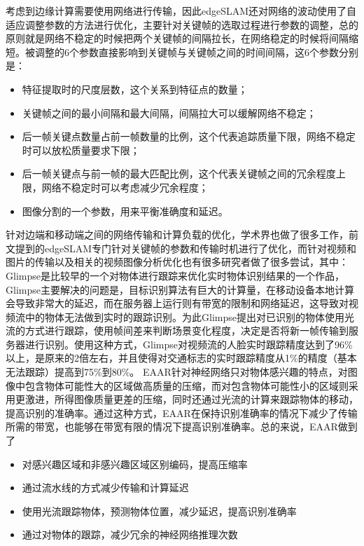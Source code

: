 考虑到边缘计算需要使用网络进行传输，因此edgeSLAM还对网络的波动使用了自适应调整参数的方法进行优化，主要针对关键帧的选取过程进行参数的调整，总的原则就是网络不稳定的时候把两个关键帧的间隔拉长，在网络稳定的时候将间隔缩短。被调整的6个参数直接影响到关键帧与关键帧之间的时间间隔，这6个参数分别是：
\begin{itemize}
  \item 特征提取时的尺度层数，这个关系到特征点的数量；
  \item 关键帧之间的最小间隔和最大间隔，间隔拉大可以缓解网络不稳定；
  \item 后一帧关键点数量占前一帧数量的比例，这个代表追踪质量下限，网络不稳定时可以放松质量要求下限；
  \item 后一帧关键点与前一帧的最大匹配比例，这个代表关键帧之间的冗余程度上限，网络不稳定时可以考虑减少冗余程度；
  \item 图像分割的一个参数，用来平衡准确度和延迟。
\end{itemize}

针对边端和移动端之间的网络传输和计算负载的优化，学术界也做了很多工作，前文提到的edgeSLAM专门针对关键帧的参数和传输时机进行了优化，而针对视频和图片的传输以及相关的视频图像分析优化也有很多研究者做了很多尝试，其中：
Glimpse\cite{CheRavDen15}是比较早的一个对物体进行跟踪来优化实时物体识别结果的一个作品，Glimpse主要解决的问题是，目标识别算法有巨大的计算量，在移动设备本地计算会导致非常大的延迟，而在服务器上运行则有带宽的限制和网络延迟，这导致对视频流中的物体无法做到实时的跟踪识别。为此Glimpse提出对已识别的物体使用光流的方式进行跟踪，使用帧间差来判断场景变化程度，决定是否将新一帧传输到服务器进行识别。使用这种方式，Glimpse对视频流的人脸实时跟踪精度达到了96\%以上，是原来的2倍左右，并且使得对交通标志的实时跟踪精度从1\%的精度（基本无法跟踪）提高到75\%到80\%。
EAAR\cite{DuPerYua20}针对神经网络只对物体感兴趣的特点，对图像中包含物体可能性大的区域做高质量的压缩，而对包含物体可能性小的区域则采用更激进，所得图像质量更差的压缩，同时还通过光流的计算来跟踪物体的移动，提高识别的准确率。通过这种方式，EAAR在保持识别准确率的情况下减少了传输所需的带宽，也能够在带宽有限的情况下提高识别准确率。总的来说，EAAR做到了
\begin{itemize}
  \item 对感兴趣区域和非感兴趣区域区别编码，提高压缩率
  \item 通过流水线的方式减少传输和计算延迟
  \item 使用光流跟踪物体，预测物体位置，减少延迟，提高识别准确率
  \item 通过对物体的跟踪，减少冗余的神经网络推理次数
\end{itemize}


